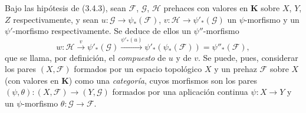 \begin{env}[3.5.2]
\label{0.3.5.2-fr}
Bajo las hipótesis de (3.4.3), sean $\mathcal{F}$, $\mathcal{G}$,
$\mathcal{H}$ prehaces con valores en $\boldsymbol{K}$ sobre $X$, $Y$, $Z$
respectivamente, y sean
$u:\mathcal{G}\to\psi_*(\mathcal{F})$,
$v:\mathcal{H}\to\psi'_*(\mathcal{G})$ un $\psi$-morfismo y un
$\psi'$-morfismo respectivamente. Se deduce de ellos un $\psi''$-morfismo
\[
  w:\mathcal{H}\xrightarrow{v}\psi'_*(\mathcal{G})
  \xrightarrow{\psi'_*(u)}
  \psi'_*(\psi_*(\mathcal{F}))=\psi''_*(\mathcal{F}),
\]
que se llama, por definición, el \emph{compuesto} de $u$ y de $v$. Se puede,
pues, considerar los pares $(X,\mathcal{F})$ formados por un espacio topológico
$X$ y un prehaz $\mathcal{F}$ sobre $X$ (con valores en $\boldsymbol{K}$)
como una \emph{categoría}, cuyos morfismos son los pares
$(\psi,\theta):(X,\mathcal{F})\to(Y,\mathcal{G})$ formados por una aplicación
continua $\psi:X\to Y$ y un $\psi$-morfismo
$\theta:\mathcal{G}\to\mathcal{F}$.
\end{env}

